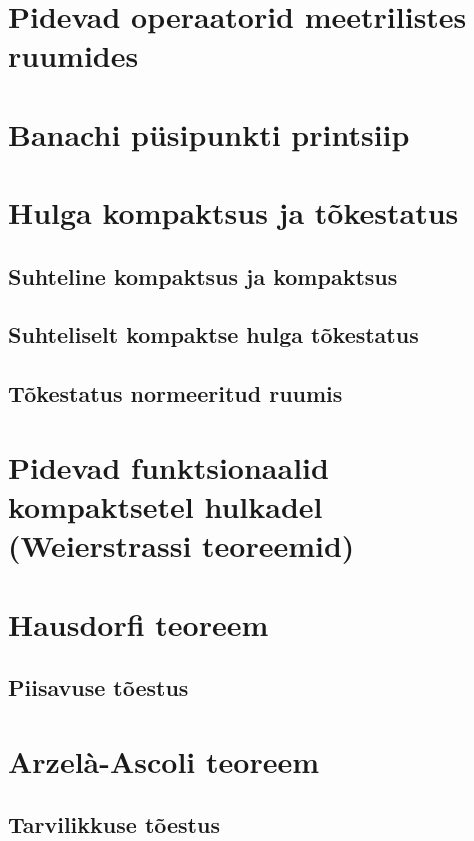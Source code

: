 \documentclass{article}[12pt]
\theoremstyle{definition}
\theoremstyle{definition}
\theoremstyle{definition}
\theoremstyle{break}
\begin{document}
\section{Pidevad operaatorid meetrilistes ruumides}

\section{Banachi püsipunkti printsiip}

\section{Hulga kompaktsus ja tõkestatus}

\subsection*{Suhteline kompaktsus ja kompaktsus}

\subsection*{Suhteliselt kompaktse hulga tõkestatus}

\subsection*{Tõkestatus normeeritud ruumis}

\section{Pidevad funktsionaalid kompaktsetel hulkadel (Weierstrassi teoreemid)}

\section{Hausdorfi teoreem}

\subsection*{Piisavuse tõestus}

\section{Arzelà-Ascoli teoreem}

\subsection*{Tarvilikkuse tõestus}
\end{document}
